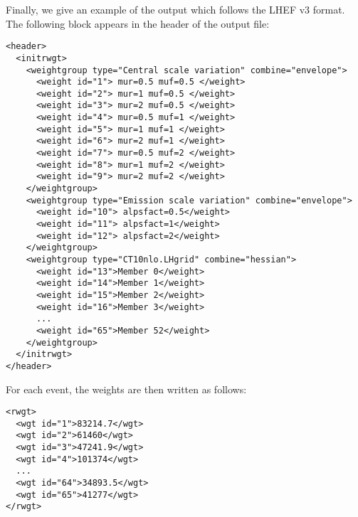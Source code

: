 Finally, we give an example of the \syscalc output which follows the LHEF v3 format. The following block appears in the header of the output file:

\footnotesize{
\begin{verbatim}
<header>
  <initrwgt>
    <weightgroup type="Central scale variation" combine="envelope">
      <weight id="1"> mur=0.5 muf=0.5 </weight>
      <weight id="2"> mur=1 muf=0.5 </weight>
      <weight id="3"> mur=2 muf=0.5 </weight>
      <weight id="4"> mur=0.5 muf=1 </weight>
      <weight id="5"> mur=1 muf=1 </weight>
      <weight id="6"> mur=2 muf=1 </weight>
      <weight id="7"> mur=0.5 muf=2 </weight>
      <weight id="8"> mur=1 muf=2 </weight>
      <weight id="9"> mur=2 muf=2 </weight>
    </weightgroup>
    <weightgroup type="Emission scale variation" combine="envelope">
      <weight id="10"> alpsfact=0.5</weight>
      <weight id="11"> alpsfact=1</weight>
      <weight id="12"> alpsfact=2</weight>
    </weightgroup>
    <weightgroup type="CT10nlo.LHgrid" combine="hessian">
      <weight id="13">Member 0</weight>
      <weight id="14">Member 1</weight>
      <weight id="15">Member 2</weight>
      <weight id="16">Member 3</weight>
      ...
      <weight id="65">Member 52</weight>
    </weightgroup>
  </initrwgt>
</header>
\end{verbatim}}

\noindent For each event, the weights are then written as follows:
\footnotesize{
\begin{verbatim}
<rwgt>
  <wgt id="1">83214.7</wgt>
  <wgt id="2">61460</wgt>
  <wgt id="3">47241.9</wgt>
  <wgt id="4">101374</wgt>
  ...
  <wgt id="64">34893.5</wgt>
  <wgt id="65">41277</wgt>
</rwgt>
\end{verbatim}}
\normalsize


